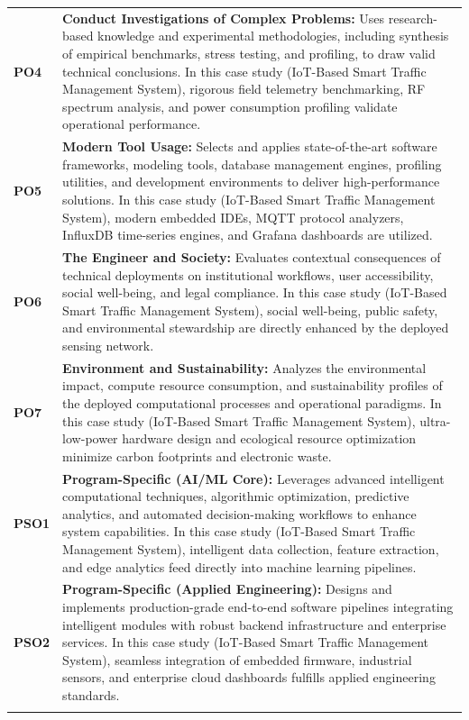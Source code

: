 {\begin{longtable}{@{}>{\centering\arraybackslash}p{1.8cm} p{13.2cm}@{}}
    \addlinespace
\textbf{PO4} & \textbf{Conduct Investigations of Complex Problems:} Uses research-based knowledge and experimental methodologies, including synthesis of empirical benchmarks, stress testing, and profiling, to draw valid technical conclusions. In this case study (IoT-Based Smart Traffic Management System), rigorous field telemetry benchmarking, RF spectrum analysis, and power consumption profiling validate operational performance. \\
    \addlinespace
\textbf{PO5} & \textbf{Modern Tool Usage:} Selects and applies state-of-the-art software frameworks, modeling tools, database management engines, profiling utilities, and development environments to deliver high-performance solutions. In this case study (IoT-Based Smart Traffic Management System), modern embedded IDEs, MQTT protocol analyzers, InfluxDB time-series engines, and Grafana dashboards are utilized. \\
    \addlinespace
\textbf{PO6} & \textbf{The Engineer and Society:} Evaluates contextual consequences of technical deployments on institutional workflows, user accessibility, social well-being, and legal compliance. In this case study (IoT-Based Smart Traffic Management System), social well-being, public safety, and environmental stewardship are directly enhanced by the deployed sensing network. \\
    \addlinespace
\textbf{PO7} & \textbf{Environment and Sustainability:} Analyzes the environmental impact, compute resource consumption, and sustainability profiles of the deployed computational processes and operational paradigms. In this case study (IoT-Based Smart Traffic Management System), ultra-low-power hardware design and ecological resource optimization minimize carbon footprints and electronic waste. \\
    \addlinespace
\textbf{PSO1} & \textbf{Program-Specific (AI/ML Core):} Leverages advanced intelligent computational techniques, algorithmic optimization, predictive analytics, and automated decision-making workflows to enhance system capabilities. In this case study (IoT-Based Smart Traffic Management System), intelligent data collection, feature extraction, and edge analytics feed directly into machine learning pipelines. \\
    \addlinespace
\textbf{PSO2} & \textbf{Program-Specific (Applied Engineering):} Designs and implements production-grade end-to-end software pipelines integrating intelligent modules with robust backend infrastructure and enterprise services. In this case study (IoT-Based Smart Traffic Management System), seamless integration of embedded firmware, industrial sensors, and enterprise cloud dashboards fulfills applied engineering standards. \\
    \addlinespace
    \bottomrule
\end{longtable}}